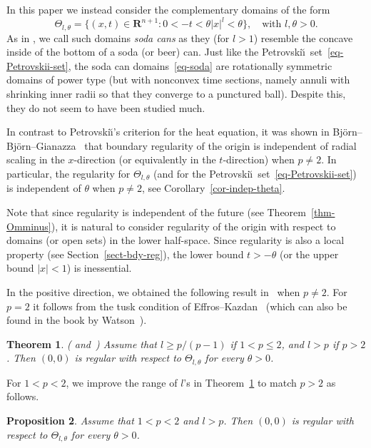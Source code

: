 \documentclass[a4paper, twoside]{article}
\theoremstyle{propositional}
\newtheorem{thm}{Theorem}[section]
\newtheorem{prop}[thm]{Proposition}
\theoremstyle{descriptive}
\numberwithin{equation}{section}
\newcommand{\R}{\mathbf{R}}
\begin{document}
In this paper we instead consider the complementary
domains of the form
\begin{equation} \label{eq-soda}
    \Theta_{l,\theta} = \{(x,t) \in \R^{n+1}: 0<-t < \theta |x|^l <\theta\}, \quad
\text{with $l,\theta >0$.}
\end{equation}
As in \cite{BBGP}, we call such domains \emph{soda cans} as they (for $l>1$)
resemble the concave inside of the bottom
of a soda (or beer) can.
Just like the Petrovski\u\i\ set~\eqref{eq-Petrovskii-set},
the soda can domains~\eqref{eq-soda}
are rotationally symmetric domains of power type
(but with nonconvex time sections, namely annuli with shrinking
inner radii so that they converge to a punctured ball).
Despite this, they   
do not seem to have been studied much.


In contrast to Petrovski\u\i's criterion for the heat equation,
it was shown in 
Bj\"orn--Bj\"orn--Gianazza~\cite[Proposition~4.1]{BBG}
that   boundary regularity of the origin is independent of 
radial scaling in the $x$-direction 
(or equivalently  in the $t$-direction) when $p \ne 2$.
In particular, the regularity
for $\Theta_{l,\theta}$
(and for the Petrovski\u\i\ set~\eqref{eq-Petrovskii-set}) 
is independent of $\theta$ 
when $p \ne 2$, see Corollary~\ref{cor-indep-theta}.

Note that since regularity is independent of the future 
(see Theorem~\ref{thm-Omminus}),
it is natural to consider regularity
of the origin with respect to domains (or open sets) in 
the lower half-space.
Since regularity is also  a local property (see Section~\ref{sect-bdy-reg}),
the lower bound $t > -\theta$
(or the upper bound $|x|< 1$)
is inessential.


In the positive direction, we obtained 
the following result 
in~\cite{BBGP} when $p \ne 2$.
For $p=2$ it follows from the tusk condition
of Effros--Kazdan~\cite{EfKaz}
(which can also be found in the book by Watson~\cite[Theorem~8.52]{watson}).

\begin{thm} \label{thm-soda-reg}
\textup{(\cite[Proposition~4.2]{BBGP} and~\cite{EfKaz})}
Assume that $l\ge p/(p-1)$ if $1<p \le 2$, and $l>p$ if $p>2$.
Then $(0,0)$  is regular with respect to $\Theta_{l,\theta}$ 
for every $\theta>0$.
\end{thm}

For $1<p<2$, we improve the range of $l$'s in Theorem~\ref{thm-soda-reg}
to match $p>2$ as follows.


\begin{prop}   \label{prop-l>p-reg}
Assume that $1<p<2$ and $l>p$.
Then $(0,0)$  is regular with respect to $\Theta_{l,\theta}$ 
for every $\theta>0$.
\end{prop}
\end{document}
